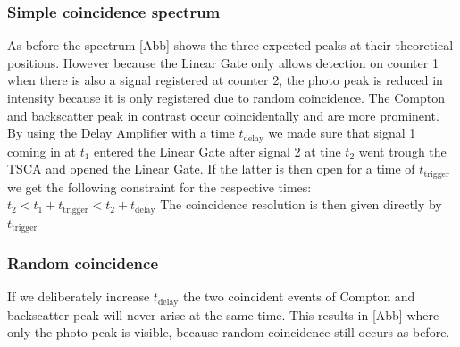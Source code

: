 \subsubsection{Simple coincidence spectrum}
%
As before the spectrum [Abb] shows the three expected peaks at their theoretical positions. However because the Linear Gate only allows detection on counter 1 when there is also a signal registered at counter 2, the photo peak is reduced in intensity because it is only registered due to random coincidence. The Compton and backscatter peak in contrast occur coincidentally and are more prominent.
By using the Delay Amplifier with a time $t_{\text{delay}}$ we made sure that signal 1 coming in at $t_1$ entered the Linear Gate after signal 2 at tine $t_2$ went trough the TSCA and opened the Linear Gate. If the latter is then open for a time of $t_{\text{trigger}}$ we get the following constraint for the respective times:
$t_2 < t_1 + t_{\text{trigger}} < t_2 +  t_{\text{delay}}$
The coincidence resolution is then given directly by $t_{\text{trigger}}$
%
\subsubsection{Random coincidence}
%
If we deliberately increase $t_{\text{delay}}$ the two coincident events of Compton and backscatter peak will never arise at the same time. This results in [Abb] where only the photo peak is visible, because  random coincidence still occurs as before.
%
